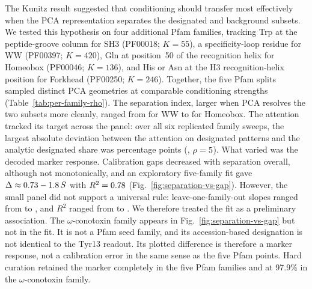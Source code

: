 The Kunitz result suggested that conditioning should transfer most effectively when the PCA
representation separates the designated and background subsets. We tested this hypothesis on
four additional Pfam families, tracking Trp at the peptide-groove column for SH3 (PF00018;
$K=55$), a specificity-loop residue for WW (PF00397; $K=420$), Gln at position~50 of the
recognition helix for Homeobox (PF00046; $K=136$), and His or Asn at the H3 recognition-helix
position for Forkhead (PF00250; $K=246$). Together, the five Pfam splits sampled distinct
PCA geometries at comparable conditioning strengths (Table~\ref{tab:per-family-rho}). The
separation index, larger when PCA resolves the two subsets more cleanly, ranged from
\WWSeparation{} for WW to \HomeoboxSeparation{} for Homeobox.
The attention tracked its target across the panel: over all six replicated family
sweeps, the largest absolute deviation between the attention on designated patterns and the
analytic designated share was \AttnMaxDevPts{} percentage points (\AttnMaxDevFamily{},
$\rho=5$). What varied was the decoded marker response.
Calibration gaps decreased with separation
overall, although not monotonically, and an exploratory five-family fit gave
$\Delta\approx0.73{} -1.8\,S$ with $R^{2}=0.78$
(Fig.~\ref{fig:separation-vs-gap}). However, the small panel did not support a universal rule:
leave-one-family-out slopes ranged from \RelationLooSlopeMin{} to \RelationLooSlopeMax{}, and
$R^{2}$ ranged from \RelationLooRsqMin{} to \RelationLooRsqMax{}. We therefore treated the fit
as a preliminary association. The $\omega$-conotoxin family appears in
Fig.~\ref{fig:separation-vs-gap} but not in the fit. It is not a Pfam seed family, and its
accession-based designation is not identical to the Tyr13 readout. Its plotted difference is
therefore a marker response, not a calibration error in the same sense as the five Pfam points.
Hard curation retained the marker completely in the five Pfam families and at 97.9\% in the
$\omega$-conotoxin family.

\DisplaySeparation

